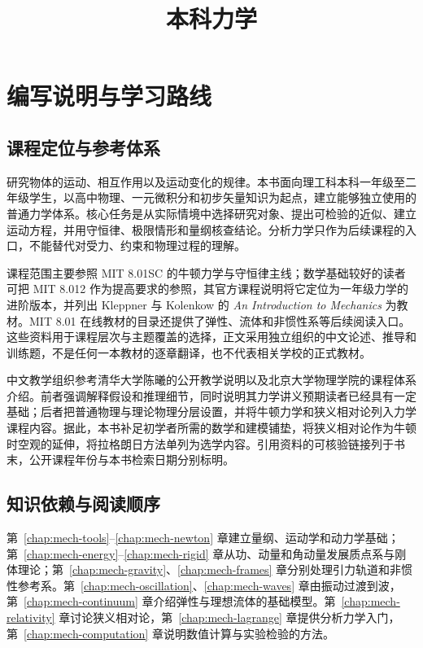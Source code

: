 \documentclass[UTF8,12pt,a4paper,fontset=fandol]{ctexbook}
\title{本科力学}
\author{}
\date{}
\begin{document}
\frontmatter
\maketitle
\tableofcontents

\chapter{编写说明与学习路线}
\label{chap:mech-preface}

\section{课程定位与参考体系}
研究物体的运动、相互作用以及运动变化的规律。本书面向理工科本科一年级至二年级学生，以高中物理、一元微积分和初步矢量知识为起点，建立能够独立使用的普通力学体系。核心任务是从实际情境中选择研究对象、提出可检验的近似、建立运动方程，并用守恒律、极限情形和量纲核查结论。分析力学只作为后续课程的入口，不能替代对受力、约束和物理过程的理解。

课程范围主要参照 MIT 8.01SC 的牛顿力学与守恒律主线；数学基础较好的读者可把 MIT 8.012 作为提高要求的参照，其官方课程说明将它定位为一年级力学的进阶版本，并列出 Kleppner 与 Kolenkow 的 \textit{An Introduction to Mechanics} 为教材\cite{mit801,mit8012}。MIT 8.01 在线教材的目录还提供了弹性、流体和非惯性系等后续阅读入口\cite{dourmashkin}。这些资料用于课程层次与主题覆盖的选择，正文采用独立组织的中文论述、推导和训练题，不是任何一本教材的逐章翻译，也不代表相关学校的正式教材。

中文教学组织参考清华大学陈曦的公开教学说明以及北京大学物理学院的课程体系介绍。前者强调解释假设和推理细节，同时说明其力学讲义预期读者已经具有一定基础；后者把普通物理与理论物理分层设置，并将牛顿力学和狭义相对论列入力学课程内容\cite{tsinghua-chen,pku-curriculum}。据此，本书补足初学者所需的数学和建模铺垫，将狭义相对论作为牛顿时空观的延伸，将拉格朗日方法单列为选学内容。引用资料的可核验链接列于书末，公开课程年份与本书检索日期分别标明。

\section{知识依赖与阅读顺序}
第~\ref{chap:mech-tools}--\ref{chap:mech-newton} 章建立量纲、运动学和动力学基础；第~\ref{chap:mech-energy}--\ref{chap:mech-rigid} 章从功、动量和角动量发展质点系与刚体理论；第~\ref{chap:mech-gravity}、\ref{chap:mech-frames} 章分别处理引力轨道和非惯性参考系。第~\ref{chap:mech-oscillation}、\ref{chap:mech-waves} 章由振动过渡到波，第~\ref{chap:mech-continuum} 章介绍弹性与理想流体的基础模型。第~\ref{chap:mech-relativity} 章讨论狭义相对论，第~\ref{chap:mech-lagrange} 章提供分析力学入门，第~\ref{chap:mech-computation} 章说明数值计算与实验检验的方法。
\end{document}
